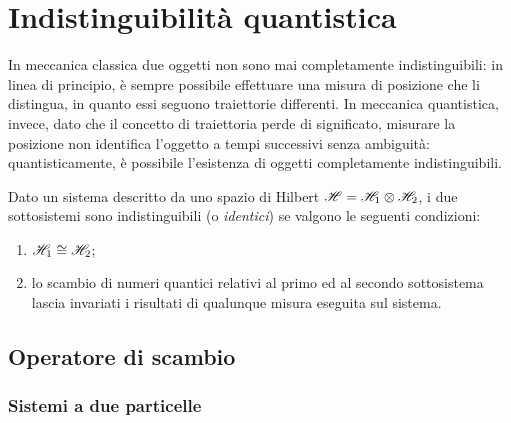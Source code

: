 
\section{Indistinguibilità quantistica}

In meccanica classica due oggetti non sono mai completamente indistinguibili: in linea di principio, è sempre possibile effettuare una misura di posizione che li distingua, in quanto essi seguono traiettorie differenti. In meccanica quantistica, invece, dato che il concetto di traiettoria perde di significato, misurare la posizione non identifica l'oggetto a tempi successivi senza ambiguità: quantisticamente, è possibile l'esistenza di oggetti completamente indistinguibili.

\begin{definition}
	Dato un sistema descritto da uno spazio di Hilbert $ \mathscr{H} = \mathscr{H}_1 \otimes \mathscr{H}_2 $, i due sottosistemi sono indistinguibili (o \textit{identici}) se valgono le seguenti condizioni:
	\begin{enumerate}
		\item $ \mathscr{H}_1 \cong \mathscr{H}_2 $;
		\item lo scambio di numeri quantici relativi al primo ed al secondo sottosistema lascia invariati i risultati di qualunque misura eseguita sul sistema.
	\end{enumerate}
\end{definition}

\subsection{Operatore di scambio}

\subsubsection{Sistemi a due particelle}

